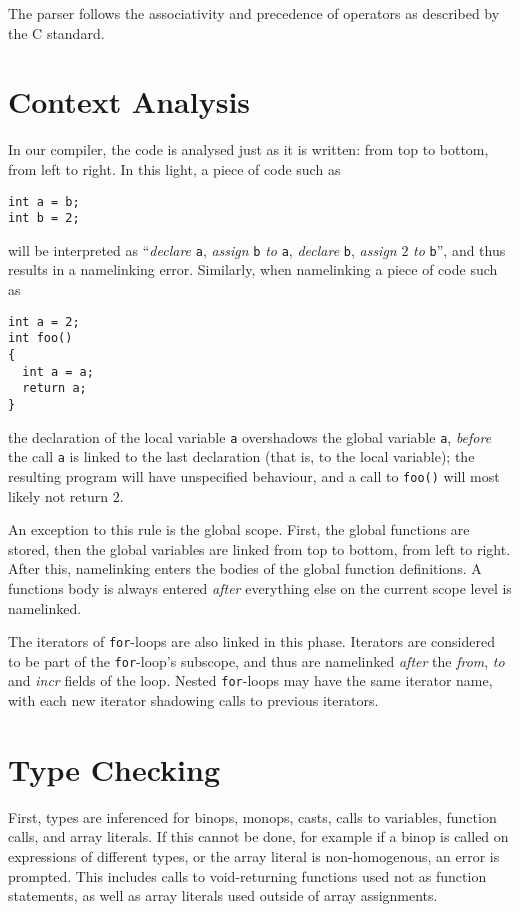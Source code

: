 \documentclass[a4paper,11pt]{report}
\begin{document}
The parser follows the associativity and precedence of operators as described by the C standard.

\section{Context Analysis}
In our compiler, the code is analysed just as it is written: from top to bottom, from left to right. In this light, a piece of code such as
\begin{verbatim}
int a = b;
int b = 2;
\end{verbatim}
will be interpreted as ``\emph{declare} \texttt{a}, \emph{assign} \texttt{b} \emph{to} \texttt{a}, \emph{declare} \texttt{b}, \emph{assign} $2$ \emph{to} \texttt{b}'', and thus results in a namelinking error. Similarly, when namelinking a piece of code such as
\begin{verbatim}
int a = 2;
int foo()
{
  int a = a;
  return a;
}
\end{verbatim}
the declaration of the local variable \texttt{a} overshadows the global variable \texttt{a}, \emph{before} the call \texttt{a} is linked to the last declaration (that is, to the local variable); the resulting program will have unspecified behaviour, and a call to \texttt{foo()} will most likely not return $2$.

An exception to this rule is the global scope. First, the global functions are stored, then the global variables are linked from top to bottom, from left to right. After this, namelinking enters the bodies of the global function definitions. A functions body is always entered \emph{after} everything else on the current scope level is namelinked.

The iterators of \texttt{for}-loops are also linked in this phase. Iterators are considered to be part of the \texttt{for}-loop's subscope, and thus are namelinked \emph{after} the \emph{from}, \emph{to} and \emph{incr} fields of the loop. Nested \texttt{for}-loops may have the same iterator name, with each new iterator shadowing calls to previous iterators.

\section{Type Checking}
First, types are inferenced for binops, monops, casts, calls to variables, function calls, and array literals. If this cannot be done, for example if a binop is called on expressions of different types, or the array literal is non-homogenous, an error is prompted. This includes calls to void-returning functions used not as function statements, as well as array literals used outside of array assignments.
\end{document}
